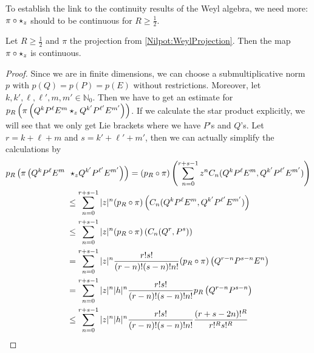 To establish the link to the continuity results of the Weyl algebra,
we need more: $\pi \circ \star_z$ should to be continuous for $R \geq \frac 
1 2$.
\begin{proposition}
    \label{proposition:ContinuousProductInWeyl}%
    Let $R \geq \frac{1}{2}$ and $\pi$ the projection from
    \eqref{Nilpot:WeylProjection}. Then the map $\pi \circ
    \star_z$ is continuous.
\end{proposition}
\begin{proof}
    Since we are in finite dimensions, we can choose a
    submultiplicative norm $p$ with $p(Q) = p(P) = p(E)$ without
    restrictions. Moreover, let $k, k', \ell, \ell', m, m' \in
    \mathbb{N}_0$. Then we have to get an estimate for $p_R \left(
    \pi\left( Q^k P^{\ell} E^m \star_z Q^{k'} P^{\ell'} E^{m'}
    \right) \right)$.  If we calculate the star product
    explicitly, we will see that we only get Lie brackets where we have
    $P$'s and $Q$'s. Let $r = k + \ell + m$ and $s = k' + \ell' + m'$,
    then we can actually simplify the calculations by
    \begin{align*}
        p_R \left(
         	\pi\left( 
         		Q^k P^{\ell} E^m
         		\right.
         	\right.
        &
         	\left.
         		\left.
         		\ostar_z
         		Q^{k'} P^{\ell'} E^{m'}
         	\right)
        \right)
        =
        (p_R \circ \pi) \left(
        \sum\limits_{n=0}^{r + s - 1}
        z^n C_n(Q^k P^{\ell} E^m,
        Q^{k'} P^{\ell'} E^{m'})
        \right)
        \\
        & \leq
        \sum\limits_{n=0}^{r + s - 1}
        |z|^n
        (p_R \circ \pi) \left(
        C_n(Q^k P^{\ell} E^m,
        Q^{k'} P^{\ell'} E^{m'})
        \right)
        \\
        & \leq
        \sum\limits_{n=0}^{r + s - 1}
        |z|^n
        (p_R \circ \pi) \left(
        C_n(Q^r, P^s)
        \right)
        \\
        & =
        \sum\limits_{n=0}^{r + s - 1}
        |z|^n
        \frac{r! s!}{(r-n)! (s-n)! n!}
        (p_R \circ \pi) \left(
        Q^{r-n} P^{s-n} E^n
        \right)
        \\
        & =
        \sum\limits_{n=0}^{r + s - 1}
        |z|^n |h|^n
        \frac{r! s!}{(r-n)! (s-n)! n!}
        p_R \left(
        Q^{r-n} P^{s-n}
        \right)
        \\
        & \leq
        \sum\limits_{n=0}^{r + s - 1}
        |z|^n |h|^n
        \frac{r! s!}{(r-n)! (s-n)! n!}
        \frac{(r + s - 2n)!^R}{r!^R s!^R}

\end{align*}
\end{proof}
